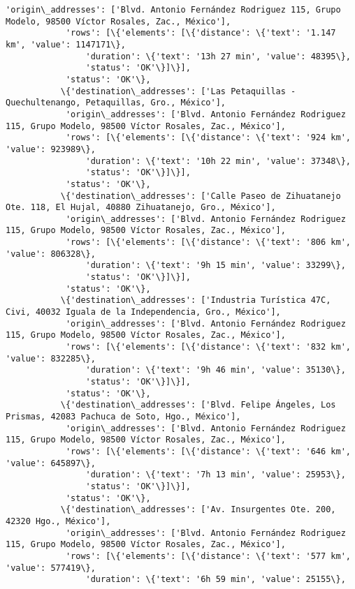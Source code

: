 \documentclass[11pt]{article}
\begin{document}
\begin{Verbatim}[commandchars=\\\{\}]
            'origin\_addresses': ['Blvd. Antonio Fernández Rodriguez 115, Grupo Modelo, 98500 Víctor Rosales, Zac., México'],
            'rows': [\{'elements': [\{'distance': \{'text': '1.147 km', 'value': 1147171\},
                'duration': \{'text': '13h 27 min', 'value': 48395\},
                'status': 'OK'\}]\}],
            'status': 'OK'\},
           \{'destination\_addresses': ['Las Petaquillas - Quechultenango, Petaquillas, Gro., México'],
            'origin\_addresses': ['Blvd. Antonio Fernández Rodriguez 115, Grupo Modelo, 98500 Víctor Rosales, Zac., México'],
            'rows': [\{'elements': [\{'distance': \{'text': '924 km', 'value': 923989\},
                'duration': \{'text': '10h 22 min', 'value': 37348\},
                'status': 'OK'\}]\}],
            'status': 'OK'\},
           \{'destination\_addresses': ['Calle Paseo de Zihuatanejo Ote. 118, El Hujal, 40880 Zihuatanejo, Gro., México'],
            'origin\_addresses': ['Blvd. Antonio Fernández Rodriguez 115, Grupo Modelo, 98500 Víctor Rosales, Zac., México'],
            'rows': [\{'elements': [\{'distance': \{'text': '806 km', 'value': 806328\},
                'duration': \{'text': '9h 15 min', 'value': 33299\},
                'status': 'OK'\}]\}],
            'status': 'OK'\},
           \{'destination\_addresses': ['Industria Turística 47C, Civi, 40032 Iguala de la Independencia, Gro., México'],
            'origin\_addresses': ['Blvd. Antonio Fernández Rodriguez 115, Grupo Modelo, 98500 Víctor Rosales, Zac., México'],
            'rows': [\{'elements': [\{'distance': \{'text': '832 km', 'value': 832285\},
                'duration': \{'text': '9h 46 min', 'value': 35130\},
                'status': 'OK'\}]\}],
            'status': 'OK'\},
           \{'destination\_addresses': ['Blvd. Felipe Ángeles, Los Prismas, 42083 Pachuca de Soto, Hgo., México'],
            'origin\_addresses': ['Blvd. Antonio Fernández Rodriguez 115, Grupo Modelo, 98500 Víctor Rosales, Zac., México'],
            'rows': [\{'elements': [\{'distance': \{'text': '646 km', 'value': 645897\},
                'duration': \{'text': '7h 13 min', 'value': 25953\},
                'status': 'OK'\}]\}],
            'status': 'OK'\},
           \{'destination\_addresses': ['Av. Insurgentes Ote. 200, 42320 Hgo., México'],
            'origin\_addresses': ['Blvd. Antonio Fernández Rodriguez 115, Grupo Modelo, 98500 Víctor Rosales, Zac., México'],
            'rows': [\{'elements': [\{'distance': \{'text': '577 km', 'value': 577419\},
                'duration': \{'text': '6h 59 min', 'value': 25155\},

\end{Verbatim}
\end{document}

